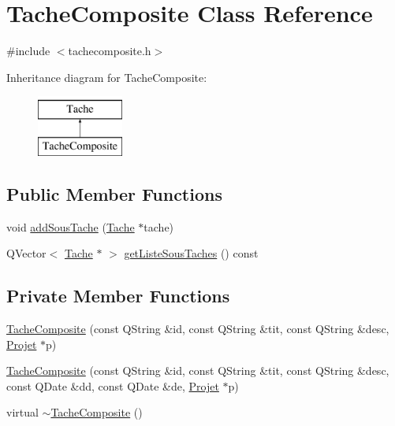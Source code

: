 \hypertarget{class_tache_composite}{}\section{Tache\+Composite Class Reference}
\label{class_tache_composite}


{\ttfamily \#include $<$tachecomposite.\+h$>$}

Inheritance diagram for Tache\+Composite\+:\begin{figure}[H]
\begin{center}
\leavevmode
\includegraphics[height=2.000000cm]{class_tache_composite}
\end{center}
\end{figure}
\subsection*{Public Member Functions}
\begin{DoxyCompactItemize}
\item 
void \hyperlink{class_tache_composite_ab4243a926687c17556eeaa34ecbe1567}{add\+Sous\+Tache} (\hyperlink{class_tache}{Tache} $\ast$tache)
\item 
Q\+Vector$<$ \hyperlink{class_tache}{Tache} $\ast$ $>$ \hyperlink{class_tache_composite_a4c7408084fe783835b083501757a1c19}{get\+Liste\+Sous\+Taches} () const 
\end{DoxyCompactItemize}
\subsection*{Private Member Functions}
\begin{DoxyCompactItemize}
\item 
\hyperlink{class_tache_composite_a3042d6bf7df70fe0e56f314224fbae53}{Tache\+Composite} (const Q\+String \&id, const Q\+String \&tit, const Q\+String \&desc, \hyperlink{class_projet}{Projet} $\ast$p)
\item 
\hyperlink{class_tache_composite_a073e2621c0bc6cf8e61e2ef6f5e938eb}{Tache\+Composite} (const Q\+String \&id, const Q\+String \&tit, const Q\+String \&desc, const Q\+Date \&dd, const Q\+Date \&de, \hyperlink{class_projet}{Projet} $\ast$p)
\item 
virtual \hyperlink{class_tache_composite_a70ddee42aa910b22a06e8197f5873698}{$\sim$\+Tache\+Composite} ()
\end{DoxyCompactItemize}
